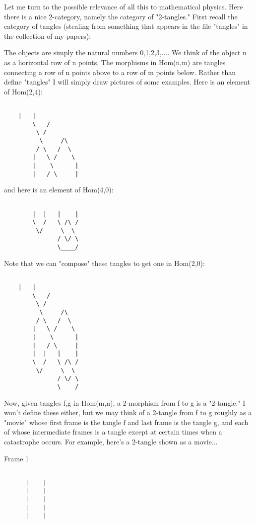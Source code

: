 Let me turn to the possible relevance of all this to mathematical
physics.  Here there is a nice 2-category, namely the category of 
"2-tangles."  First recall the category of tangles (stealing from something
that appears in the file "tangles" in the collection of my papers):

The objects are simply the natural numbers {0,1,2,3,...}.  We think
of the object n as a horizontal row of n points.  The morphisms
in Hom(n,m) are tangles connecting a row of n points above to a row of
m points below.  Rather than define "tangles" I will simply draw pictures of
some examples. Here is an element of Hom(2,4): 


\begin{verbatim}

 	|   |
        \   /
         \ /
          \     /\
         / \   /  \
        |   \ /    \
        |    \      |
        |   / \     |
\end{verbatim}
    

and here is an element of Hom(4,0):


\begin{verbatim}

        |  |   |    |
        \  /   \ /\ /
         \/     \  \
               / \/ \
               \____/
\end{verbatim}
    

Note that we can "compose" these tangles to get one in Hom(2,0):


\begin{verbatim}

 	|   |
        \   /
         \ /
          \     /\
         / \   /  \
        |   \ /    \
        |    \      |
        |   / \     |
        |  |   |    |
        \  /   \ /\ /
         \/     \  \
               / \/ \
               \____/
\end{verbatim}
    

Now, given tangles f,g in Hom(m,n), a 2-morphism from f to g is 
a "2-tangle."   I won't define these either, but we may think of a 2-tangle
from f to g roughly as a "movie" whose first frame is the tangle f and
last frame is the tangle g, and each of whose intermediate frames is a
tangle except at certain times when a catastrophe occurs.   For example,
here's a 2-tangle shown as a movie... 

Frame 1  


\begin{verbatim}

      |    |
      |    |
      |    |
      |    |
      |    |
\end{verbatim}
    

